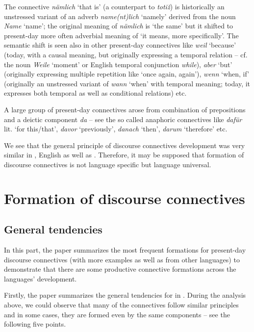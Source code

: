 \documentclass[output=paper]{langsci/langscibook.cls}
\begin{document}
The connective \textit{nämlich} `that is' (a counterpart to  \textit{totiž}) is historically an unstressed variant of an adverb \textit{name(nt)lich} `namely' derived from the noun \textit{Name} `name'; the original meaning of \textit{nämlich} is `the same' but it shifted to present-day more often adverbial meaning of `it means, more specifically'. The semantic shift is seen also in other  present-day connectives like\textit{ weil} `because' (today, with a causal meaning, but originally expressing a temporal relation – cf. the  noun \textit{Weile} `moment' or English temporal conjunction \textit{while}), \textit{aber} `but' (originally expressing multiple repetition like `once again, again'), \textit{wenn} `when, if' (originally an unstressed variant of \textit{wann} `when' with temporal meaning; today, it expresses both temporal as well as conditional relations) etc. 

A large group of present-day connectives arose from combination of prepositions and a deictic component \textit{da} – see the so called anaphoric connectives like \textit{dafür } lit. `for this/that', \textit{davor} `previously',\textit{ danach} `then', \textit{darum} `therefore' etc.


We see that the general principle of discourse connectives development was very similar in , English as well as . Therefore, it may be supposed that formation of discourse connectives is not language specific but language universal.



\section{Formation of discourse connectives}
\subsection{General tendencies}

In this part, the paper summarizes the most frequent formations for present-day discourse connectives (with more examples as well as from other languages) to demonstrate that there are some productive connective formations across the languages’ development. 


Firstly, the paper summarizes the general tendencies for  in . During the analysis above, we could observe that many of the  connectives follow similar principles and in some cases, they are formed even by the same components – see the following five points.
\end{document}
